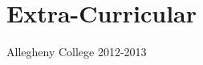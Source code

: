 \documentclass[]{brandon_ginoza_resume}
\begin{document}
\begin{minipage}[t]{0.33\textwidth}



\section{Extra-Curricular}
Allegheny College \textbullet{} 2012-2013
\sectionsep


%
%

\end{minipage} 
\end{document}
